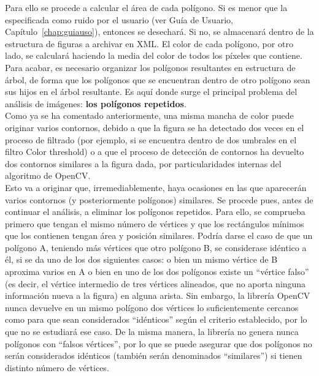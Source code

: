 {	Para ello se procede a calcular el área de cada polígono. Si es menor que la especificada como ruido por el usuario (ver Guía de Usuario, Capítulo~\ref{chap:guiauso}), entonces se desechará. Si no, se almacenará dentro de la estructura de figuras a archivar en XML. El color de cada polígono, por otro lado, se calculará haciendo la media del color de todos los píxeles que contiene.\\
	
	Para acabar, es necesario organizar los polígonos resultantes en estructura de árbol, de forma que los polígonos que se encuentran dentro de otro polígono sean sus hijos en el árbol resultante. Es aquí donde surge el principal problema del análisis de imágenes: \textbf{los polígonos repetidos}.\\
	
	Como ya se ha comentado anteriormente, una misma mancha de color puede originar varios contornos, debido a que la figura se ha detectado dos veces en el proceso de filtrado (por ejemplo, si se encuentra dentro de dos umbrales en el filtro Color threshold) o a que el proceso de detección de contornos ha devuelto dos contornos similares a la figura dada, por particularidades internas del algoritmo de OpenCV.\\
	
	Esto va a originar que, irremediablemente, haya ocasiones en las que aparecerán varios contornos (y posteriormente polígonos) similares. Se procede pues, antes de continuar el análisis, a eliminar los polígonos repetidos. Para ello, se comprueba primero que tengan el mismo número de vértices y que los rectángulos mínimos que los contienen tengan área y posición similares. Podría darse el caso de que un polígono A, teniendo más vértices que otro polígono B, se considerase idéntico a él, si se da uno de los dos siguientes casos: o bien un mismo vértice de B aproxima varios en A o bien en uno de los dos polígonos existe un ``vértice falso'' (es decir, el vértice intermedio de tres vértices alineados, que no aporta ninguna información nueva a la figura) en alguna arista. Sin embargo, la librería OpenCV nunca devuelve en un mismo polígono dos vértices lo suficientemente cercanos como para que sean considerados ``idénticos'' según el criterio establecido, por lo que no se estudiará ese caso. De la misma manera, la librería no genera nunca polígonos con ``falsos vértices'', por lo que se puede asegurar que dos polígonos no serán considerados idénticos (también serán denominados ``similares'') si tienen distinto número de vértices.\\

}
